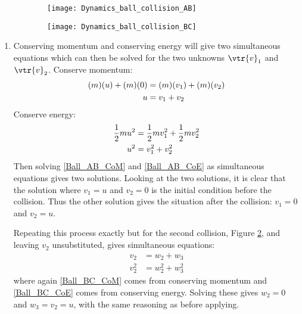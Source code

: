 \begin{hint}[A1969AMIIQ8l]
{\begin{figure}[h]
  \centering
	\begin{subfigure}{0.5\textwidth}
	\centering
 	\texttt{[image: Dynamics\_ball\_collision\_AB]}
	\caption{}
	\label{fig:Dynamics_ball_collision_AB}
	\end{subfigure}%
	\begin{subfigure}{0.5\textwidth}
	\centering
	\texttt{[image: Dynamics\_ball\_collision\_BC]}
	\caption{}
	\label{fig:Dynamics_ball_collision_BC}
	\end{subfigure}
\caption{}
\label{fig:Dynamics_ball_collisions}
\end{figure}

\begin{enumerate}
	\item Conserving momentum and conserving energy will give two simultaneous equations which can then be solved for the two unknowns $\vtr{v}_{1}$ and $\vtr{v}_{2}$.
Conserve momentum:
\begin{align} \notag (m)(u) + (m)(0) &= (m)(v_{1}) + (m)(v_{2}) \\ u &= v_{1} + v_{2} \label{Ball_AB_CoM}\end{align}
Conserve energy:
\begin{align} \notag \frac{1}{2}mu^{2} &= \frac{1}{2}mv_{1}^{2} + \frac{1}{2}mv_{2}^{2} \\ u^{2} &= v_{1}^{2} + v_{2}^{2} \label{Ball_AB_CoE}\end{align}
Then solving \eqref{Ball_AB_CoM} and \eqref{Ball_AB_CoE} as simultaneous equations gives two solutions. Looking at the two solutions, it is clear that the solution where $v_{1} = u$ and $v_{2} = 0$ is the initial condition before the collision. Thus the other solution gives the situation after the collision: $v_{1} = 0$ and $v_{2} = u$.

Repeating this process exactly but for the second collision, Figure \ref{fig:Dynamics_ball_collision_BC}, and leaving $v_{2}$ unsubstituted, gives simultaneous equations:
\begin{align} v_{2} &= w_{2} + w_{3} \label{Ball_BC_CoM} \\  v_{2}^{2} &= w_{2}^{2} + w_{3}^{2} \label{Ball_BC_CoE}\end{align}
where again \eqref{Ball_BC_CoM} comes from conserving momentum and \eqref{Ball_BC_CoE} comes from conserving energy. Solving these gives $w_{2} = 0$ and $w_{3} = v_{2} = u$, with the same reasoning as before applying.


\end{enumerate}}
\end{hint}
